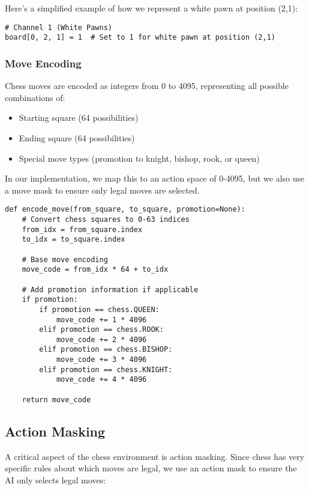 \documentclass[11pt]{article}
\begin{document}
Here's a simplified example of how we represent a white pawn at position (2,1):

\begin{lstlisting}[style=Python]
# Channel 1 (White Pawns)
board[0, 2, 1] = 1  # Set to 1 for white pawn at position (2,1)
\end{lstlisting}

\subsubsection{Move Encoding}

Chess moves are encoded as integers from 0 to 4095, representing all possible combinations of:
\begin{itemize}
    \item Starting square (64 possibilities)
    \item Ending square (64 possibilities)
    \item Special move types (promotion to knight, bishop, rook, or queen)
\end{itemize}

In our implementation, we map this to an action space of 0-4095, but we also use a move mask to ensure only legal moves are selected.

\begin{lstlisting}[style=Python]
def encode_move(from_square, to_square, promotion=None):
    # Convert chess squares to 0-63 indices
    from_idx = from_square.index
    to_idx = to_square.index
    
    # Base move encoding
    move_code = from_idx * 64 + to_idx
    
    # Add promotion information if applicable
    if promotion:
        if promotion == chess.QUEEN:
            move_code += 1 * 4096
        elif promotion == chess.ROOK:
            move_code += 2 * 4096
        elif promotion == chess.BISHOP:
            move_code += 3 * 4096
        elif promotion == chess.KNIGHT:
            move_code += 4 * 4096
    
    return move_code
\end{lstlisting}

\subsection{Action Masking}

A critical aspect of the chess environment is action masking. Since chess has very specific rules about which moves are legal, we use an action mask to ensure the AI only selects legal moves:
\end{document}
